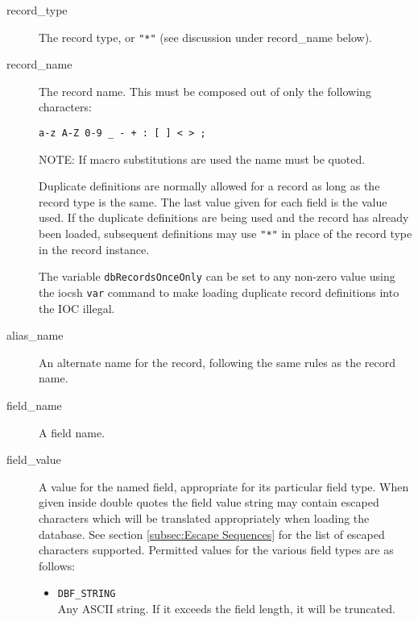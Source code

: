 \begin{description}
\item [record\_type] The record type, or \verb|"*"| (see discussion under record\_name below).

\item [record\_name] The record name.
This must be composed out of only the following characters:

\begin{verbatim}
a-z A-Z 0-9 _ - + : [ ] < > ;
\end{verbatim}

NOTE: If macro substitutions are used the name must be quoted.

Duplicate definitions are normally allowed for a record as long as the record type is the same.
The last value given for each field is the value used.
If the duplicate definitions are being used and the record has already been loaded, subsequent definitions may use \verb|"*"| in place of the record type in the record instance.

The variable \verb|dbRecordsOnceOnly| can be set to any non-zero value using the iocsh \verb|var| command to make loading duplicate record definitions into the IOC illegal.

\item [alias\_name] An alternate name for the record, following the same rules as the record name.

\item [field\_name] A field name.

\item [field\_value] A value for the named field, appropriate for its particular field type.
When given inside double quotes the field value string may contain escaped characters which will be translated appropriately when loading the database.
See section \ref{subsec:Escape Sequences} for the list of escaped characters supported.
Permitted values for the various field types are as follows:

\begin{itemize}
\item \verb|DBF_STRING| \\
Any ASCII string. If it exceeds the field length, it will be truncated.


\end{itemize}
\end{description}
